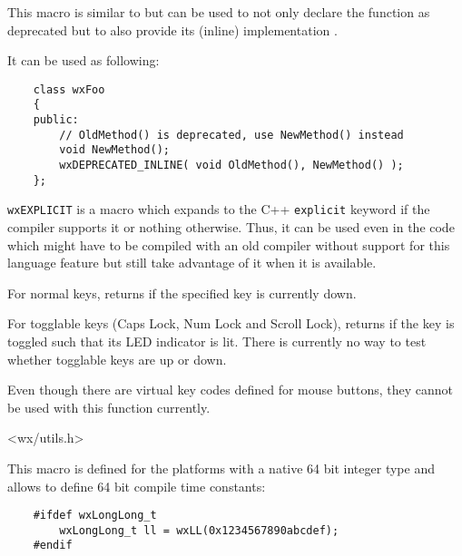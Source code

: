 \label{wxdeprecatedinline}


This macro is similar to  but can be used
to not only declare the function  as deprecated but to also provide
its (inline) implementation .

It can be used as following:
\begin{verbatim}
    class wxFoo
    {
    public:
        // OldMethod() is deprecated, use NewMethod() instead
        void NewMethod();
        wxDEPRECATED_INLINE( void OldMethod(), NewMethod() );
    };
\end{verbatim}

\label{wxexplicit}

{\tt wxEXPLICIT} is a macro which expands to the C++ {\tt explicit} keyword if
the compiler supports it or nothing otherwise. Thus, it can be used even in the
code which might have to be compiled with an old compiler without support for
this language feature but still take advantage of it when it is available.



\label{wxgetkeystate}


For normal keys, returns \true if the specified key is currently down.

For togglable keys (Caps Lock, Num Lock and Scroll Lock), returns
\true if the key is toggled such that its LED indicator is lit. There is
currently no way to test whether togglable keys are up or down.

Even though there are virtual key codes defined for mouse buttons, they
cannot be used with this function currently.


<wx/utils.h>


\label{wxll}


This macro is defined for the platforms with a native 64 bit integer type and
allows to define 64 bit compile time constants:

\begin{verbatim}
    #ifdef wxLongLong_t
        wxLongLong_t ll = wxLL(0x1234567890abcdef);
    #endif
\end{verbatim}

